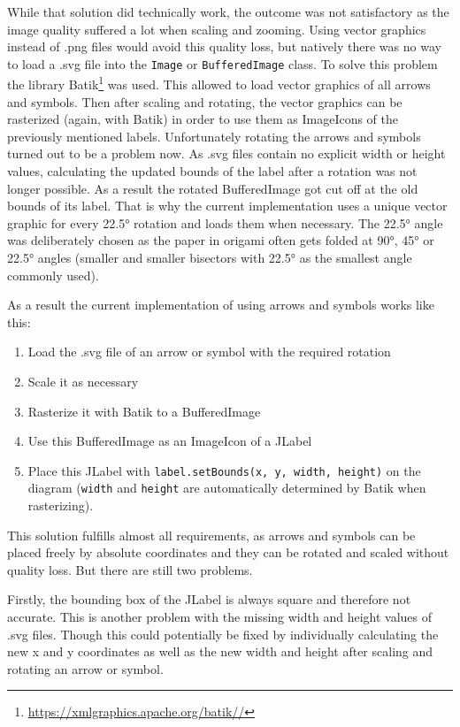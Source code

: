 While that solution did technically work, the outcome was not satisfactory as the image quality suffered a lot when scaling and zooming. Using vector graphics instead of .png files would avoid this quality loss, but natively there was no way to load a .svg file into the \texttt{Image} or \texttt{BufferedImage} class. To solve this problem the library Batik\footnote{\url{https://xmlgraphics.apache.org/batik//}} was used. This allowed to load vector graphics of all arrows and symbols. Then after scaling and rotating, the vector graphics can be rasterized (again, with Batik) in order to use them as ImageIcons of the previously mentioned labels. Unfortunately rotating the arrows and symbols turned out to be a problem now. As .svg files contain no explicit width or height values, calculating the updated bounds of the label after a rotation was not longer possible. As a result the rotated BufferedImage got cut off at the old bounds of its label. That is why the current implementation uses a unique vector graphic for every 22.5° rotation and loads them when necessary. The 22.5° angle was deliberately chosen as the paper in origami often gets folded at 90°, 45° or 22.5° angles (smaller and smaller bisectors with 22.5° as the smallest angle commonly used).%

As a result the current implementation of using arrows and symbols works like this:

\begin{enumerate}[label=\textbf{\arabic*}.]
	\item Load the .svg file of an arrow or symbol with the required rotation
	\item Scale it as necessary
	\item Rasterize it with Batik to a BufferedImage
	\item Use this BufferedImage as an ImageIcon of a JLabel
	\item Place this JLabel with \texttt{label.setBounds(x, y, width, height)}  on the diagram (\texttt{width} and \texttt{height} are automatically determined by Batik when rasterizing).
\end{enumerate}
This solution fulfills almost all requirements, as arrows and symbols can be placed freely by absolute coordinates and they can be rotated and scaled without quality loss. But there are still two problems.

Firstly, the bounding box of the JLabel is always square and therefore not accurate. This is another problem with the missing width and height values of .svg files. Though this could potentially be fixed by individually calculating the new x and y coordinates as well as the new width and height after scaling and rotating an arrow or symbol.

